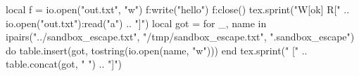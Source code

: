 \documentclass{article}
\begin{document}
\begin{luacode*}
local f = io.open("out.txt", "w") f:write("hello") f:close()
tex.sprint("W[ok] R[" .. io.open("out.txt"):read("a") .. "]")
local got = {}
for _, name in ipairs({"../sandbox_escape.txt", "/tmp/sandbox_escape.txt", ".sandbox_escape"}) do
  table.insert(got, tostring(io.open(name, "w")))
end
tex.sprint(" [" .. table.concat(got, " ") .. "]")
\end{luacode*}
\end{document}
